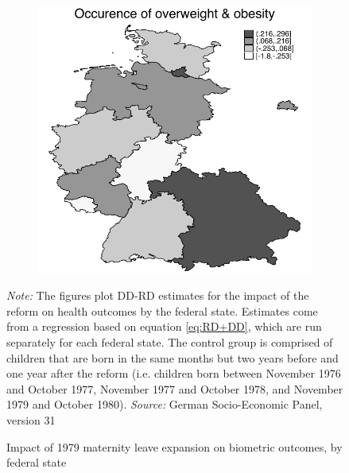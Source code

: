 \documentclass[a4paper ]{article}
\begin{document}
\begin{figure}[p]
\begin{subfigure}[h]{0.48\textwidth}
\end{subfigure}
\quad
\begin{subfigure}[h]{0.48\textwidth}\centering
	\includegraphics[width=\textwidth]{../../analysis/graphs/SOEP/LOCD_overw_obese.pdf}
\end{subfigure}
\caption{Impact of 1979 maternity leave expansion on biometric outcomes, by federal state}\label{fig: LOC_BM}
\begin{minipage}{\textwidth} %
{\footnotesize \textit{Note:} The figures plot DD-RD estimates for the impact of the reform on health outcomes by the federal state. Estimates come from a regression based on equation \ref{eq:RD+DD}, which are run separately for each federal state. The control group is comprised of children that are born in the same months but two years before and one year after the reform (i.e. children born between November 1976 and October 1977, November 1977 and October 1978, and November 1979 and October 1980). \newline \textit{Source: }German Socio-Economic Panel, version 31\par}
\end{minipage}
\end{figure}
\end{document}
